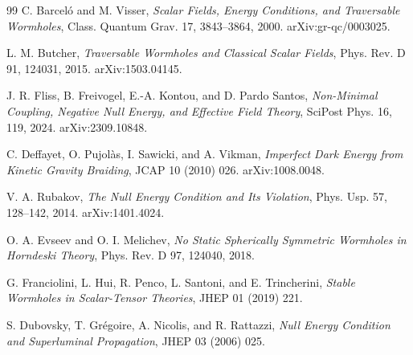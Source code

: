 \documentclass[11pt]{article}
\begin{document}
\begin{thebibliography}{99}
C. Barcel\'o and M. Visser,
\textit{Scalar Fields, Energy Conditions, and Traversable Wormholes},
Class. Quantum Grav. 17, 3843--3864, 2000.
arXiv:gr-qc/0003025.

L. M. Butcher,
\textit{Traversable Wormholes and Classical Scalar Fields},
Phys. Rev. D 91, 124031, 2015.
arXiv:1503.04145.

J. R. Fliss, B. Freivogel, E.-A. Kontou, and D. Pardo Santos,
\textit{Non-Minimal Coupling, Negative Null Energy, and Effective Field Theory},
SciPost Phys. 16, 119, 2024.
arXiv:2309.10848.

C. Deffayet, O. Pujol\`as, I. Sawicki, and A. Vikman,
\textit{Imperfect Dark Energy from Kinetic Gravity Braiding},
JCAP 10 (2010) 026.
arXiv:1008.0048.

V. A. Rubakov,
\textit{The Null Energy Condition and Its Violation},
Phys. Usp. 57, 128--142, 2014.
arXiv:1401.4024.

O. A. Evseev and O. I. Melichev,
\textit{No Static Spherically Symmetric Wormholes in Horndeski Theory},
Phys. Rev. D 97, 124040, 2018.

G. Franciolini, L. Hui, R. Penco, L. Santoni, and E. Trincherini,
\textit{Stable Wormholes in Scalar-Tensor Theories},
JHEP 01 (2019) 221.

S. Dubovsky, T. Gr\'egoire, A. Nicolis, and R. Rattazzi,
\textit{Null Energy Condition and Superluminal Propagation},
JHEP 03 (2006) 025.

\end{thebibliography}
\end{document}

